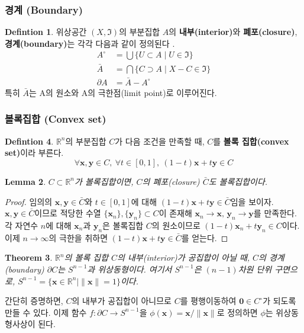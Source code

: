 \documentclass{gshs_thesis}
\theoremstyle{theorem}
\newtheorem{theorem}{Theorem}[section]
\theoremstyle{lemma}
\newtheorem{lemma}[theorem]{Lemma}
\theoremstyle{definition}
\newtheorem{definition}[theorem]{Defintion}
\begin{document}
\subsubsection{경계 (Boundary)}
\begin{definition}
	위상공간 $(X, \mathfrak{I})$의 부분집합 $A$의 \textbf{내부(interior)}와 \textbf{폐포(closure)}, \textbf{경계(boundary)}는 각각 다음과 같이 정의된다 \cite{Munkres.J.}.
	\begin{align*}
		A^\circ &= \bigcup \{ U \subset A \mid U \in \mathfrak{I} \} \\
		\bar{A} &= \bigcap \{ C \supset A \mid X-C \in \mathfrak{I} \} \\
		\partial A &= \bar{A} - A^\circ
	\end{align*}
   특히 $\bar{A}$는 A의 원소와 A의 극한점(limit point)로 이루어진다.
\end{definition}
\subsubsection{볼록집합 (Convex set)}
\begin{definition}
	$\mathbb{R}^n$의 부분집합 $C$가 다음 조건을 만족할 때, $C$를 \textbf{볼록 집합(convex set)}이라 부른다. 
	\begin{equation*}
		\forall \mathbf{x}, \mathbf{y} \in C,\ \forall t \in [0, 1],\ (1-t)\mathbf{x}+t\mathbf{y} \in C
	\end{equation*}
    \begin{lemma} \label{closureofconvexset}
	$C \subset \mathbb{R}^n$가 볼록집합이면, $C$의 폐포(closure) $\bar{C}$도 볼록집합이다. 
    \end{lemma}
    \begin{proof}
	임의의 $\mathbf{x}, \mathbf{y} \in \bar{C}$와 $t \in [0, 1]$에 대해 $(1-t)\mathbf{x} + t\mathbf{y} \in \bar{C}$임을 보이자. $\mathbf{x}, \mathbf{y} \in \bar{C}$이므로 적당한 수열 $\{ \mathbf{x}_n \}, \{ \mathbf{y}_n \} \subset C$이 존재해 $\mathbf{x}_n \to \mathbf{x}, \, \mathbf{y}_n \to \mathbf{y}$를 만족한다. 각 자연수 $n$에 대해 $\mathbf{x}_n$과 $\mathbf{y}_n$은 볼록집합 $C$의 원소이므로 $(1-t)\mathbf{x}_n + t\mathbf{y}_n \in C$이다. 이제 $n \to \infty$의 극한을 취하면 $(1-t)\mathbf{x} + t\mathbf{y} \in \bar{C}$를 얻는다. 
    \end{proof}
    \begin{theorem} \label{homeo}
	$\mathbb{R}^n$의 볼록 집합 $C$의 내부(interior)가 공집합이 아닐 때, $C$의 경계(boundary) $\partial C$는 $S^{n-1}$과 위상동형이다. 여기서 $S^{n-1}$은 $(n-1)$차원 단위 구면으로, $S^{n-1}=\{ \mathbf{x}\in\mathbb{R}^n \mid \| \mathbf{x} \| = 1 \}$이다.
    \end{theorem}
간단히 증명하면, $C$의 내부가 공집합이 아니므로 $C$를 평행이동하여 $\mathbf{0}\in C^\circ$가 되도록 만들 수 있다. 이제 함수 $f\colon\partial C \to S^{n-1}$을 $\phi(\mathbf{x})=\mathbf{x}/\|\mathbf{x}\|$로 정의하면 $\phi$는 위상동형사상이 된다. 
\end{definition}
\end{document}
